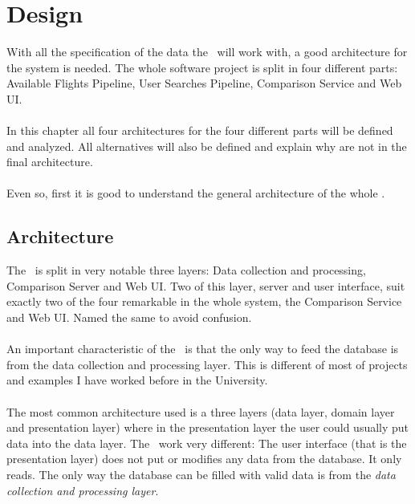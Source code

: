 
\chapter{Design}

\label{chapter06}

With all the specification of the data the \thesis\ will work with, a good architecture for the system is needed. The whole software project is split in four different parts: Available Flights Pipeline, User Searches Pipeline, Comparison Service and Web UI.
\\\\
In this chapter all four architectures for the four different parts will be defined and analyzed. All alternatives will also be defined and explain why are not in the final architecture.
\\\\
Even so, first it is good to understand the general architecture of the whole \thesis.


\section{Architecture}

The \thesis\ is split in very notable three layers: Data collection and processing, Comparison Server and Web UI. Two of this layer, server and user interface, suit exactly two of the four remarkable in the whole system, the Comparison Service and Web UI. Named the same to avoid confusion.
\\\\
An important characteristic of the \thesis\ is that the only way to feed the database is from the data collection and processing layer. This is different of most of projects and examples I have worked before in the University.
\\\\
The most common architecture used is a three layers (data layer, domain layer and presentation layer) where in the presentation layer the user could usually put data into the data layer. The \thesis\ work very different: The user interface (that is the presentation layer) does not put or modifies any data from the database. It only reads. The only way the database can be filled with valid data is from the \textit{data collection and processing layer}.

